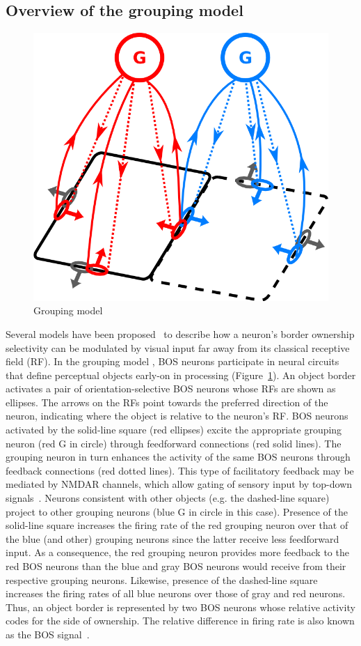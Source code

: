\documentclass[11pt,notitlepage]{article}
\begin{document}
\subsection{Overview of the grouping model}
\begin{figure}
  \vspace{-60pt}
  \centering 
  \includegraphics[width=.3\textwidth]{figs/groupingcircuit}
  \caption{Grouping model} 
  \vspace{-15pt}
  \label{fig:GroupingModel}
\end{figure}
Several models have been proposed~\citep{Zhaoping05,
  Sakai_Nishimura06,Craft_etal07, Layton_etal12} to
describe how a neuron's border ownership selectivity can be modulated
by visual input far away from its classical receptive field (RF). In the grouping model
\citep{Craft_etal07}, BOS neurons
participate in neural circuits that define perceptual objects early-on
in processing (Figure~\ref{fig:GroupingModel}). An object border
activates a pair of orientation-selective BOS neurons whose RFs are
shown as ellipses. The arrows on the RFs point towards the preferred
direction of the neuron, indicating where the object is relative to
the neuron's RF. BOS neurons activated by the solid-line square (red
ellipses) excite the appropriate grouping neuron (red G in circle)
through feedforward connections (red solid lines). The grouping neuron
in turn enhances the activity of the same BOS neurons through feedback
connections (red dotted lines). This type of facilitatory feedback may
be mediated by NMDAR channels, which allow gating of sensory input by
top-down signals~\citep{Palmer_etal14}. Neurons consistent with other
objects (e.g. the dashed-line square) project to other grouping
neurons (blue G in circle in this case). Presence of the solid-line
square increases the firing rate of the red grouping neuron over that
of the blue (and other) grouping neurons since the latter receive less
feedforward input. As a consequence, the red grouping neuron provides
more feedback to the red BOS neurons than the blue and gray BOS
neurons would receive from their respective grouping
neurons. Likewise, presence of the dashed-line square increases the
firing rates of all blue neurons over those of gray and red
neurons. Thus, an object border is represented by two BOS neurons
whose relative activity codes for the side of ownership. The relative
difference in firing rate is also known as the BOS
signal~\citep{Zhou_etal00}.
\end{document}
